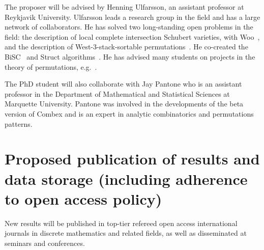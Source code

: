 \documentclass{rannis}
\newcommand{\motheralg}{\textsf{Combex}}
\newcommand{\bisc}{\textsf{BiSC}}
\newcommand{\struct}{\textsf{Struct}}
\theoremstyle{definition}
\begin{document}
The proposer will be advised by Henning Ulfarsson, an assistant professor
at Reykjavik University. Ulfarsson leads a research group in the field and has
a large network of collaborators.
He has solved two long-standing open
problems in the field: the description of local complete intersection Schubert
varieties, with Woo~\cite{UW11}, and the description of West-$3$-stack-sortable
permutations~\cite{MR2971010}. He co-created the
\bisc{}~\cite{BiSC} and \struct{} algorithms~\cite{algstruct, structpaper}.
He has advised many students on projects in the theory of permutations,
e.g.~\cite{WilfOfShort, parti, MagnussonMSC, MurrayMSC, TomasMSc, BeanPhd}.

The PhD student will also collaborate with Jay Pantone who is an
assistant professor in the
Department of Mathematical and Statistical Sciences at Marquette University.
Pantone was involved in the developments of
the beta version of \motheralg{} and is an expert in analytic combinatorics and
permutations patterns.
\\

\section{Proposed publication of results and data storage (including adherence to open access policy)}
New results will be published in top-tier refereed open access
international journals in discrete mathematics and related fields, as well as
disseminated at seminars and conferences.
\label{LastPageOfDescription}
\clearpage
\setcounter{page}{1}
\renewcommand{\lastpageref}{\pageref{LastPage}}%



\end{document}
